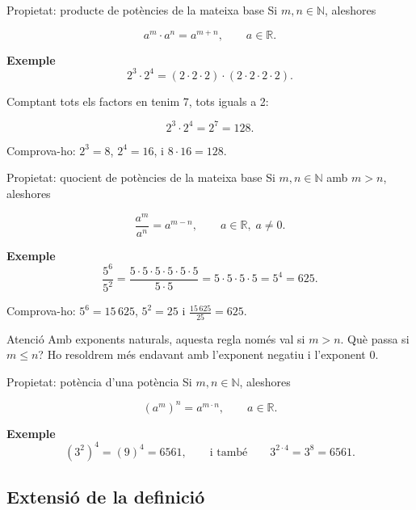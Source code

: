 \begin{propietat}{Propietat: producte de potències de la mateixa base}
Si $m,n\in\mathbb{N}$, aleshores

\[
a^m \cdot a^n = a^{m+n}, \qquad a \in \mathbb{R}.
\]
\end{propietat}

\begin{exemple}{\textbf{Exemple}}
\[
2^3 \cdot 2^4 = (2\cdot 2\cdot 2)\cdot(2\cdot 2\cdot 2\cdot 2).
\]

Comptant tots els factors en tenim 7, tots iguals a 2:

\[
2^3 \cdot 2^4 = 2^7 = 128.
\]

Comprova-ho: $2^3=8$, $2^4=16$, i $8\cdot 16 = 128$.
\end{exemple}

\begin{propietat}{Propietat: quocient de potències de la mateixa base}
Si $m,n\in\mathbb{N}$ amb $m> n$, aleshores

\[
\frac{a^m}{a^n} = a^{m-n}, \qquad a \in \mathbb{R},\; a \neq 0.
\]
\end{propietat}

\begin{exemple}{\textbf{Exemple}}
\[
\frac{5^6}{5^2}=\frac{5\cdot 5\cdot 5\cdot 5\cdot 5\cdot 5}{5\cdot 5}
=5\cdot 5\cdot 5\cdot 5 = 5^4 = 625.
\]

Comprova-ho: $5^6=15\,625$, $5^2=25$ i $\tfrac{15\,625}{25}=625$.
\end{exemple}

\begin{nota}{Atenció}
Amb exponents naturals, aquesta regla només val si $m> n$. Què passa si $m\leq n$? Ho resoldrem més endavant amb l'exponent negatiu i l'exponent $0$.
\end{nota}

\begin{propietat}{Propietat: potència d'una potència}
Si $m,n\in\mathbb{N}$, aleshores

\[
\left(a^m\right)^n = a^{m \cdot n}, \qquad a \in \mathbb{R}.
\]
\end{propietat}

\begin{exemple}{\textbf{Exemple}}
\[
\left(3^2\right)^4 = \left(9\right)^4 = 6561, \qquad\text{i també}\qquad 3^{2\cdot 4}=3^8=6561.
\]
\end{exemple}

\subsection{Extensió de la definició}

